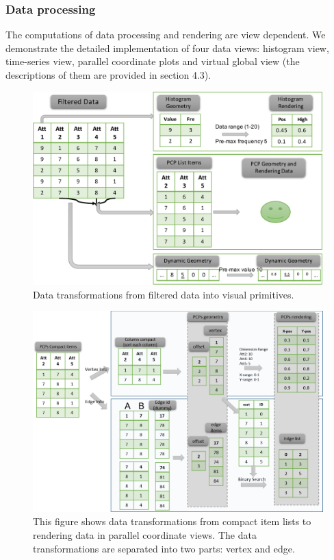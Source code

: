 \subsubsection{Data processing}
The computations of data processing and rendering are view dependent. We demonstrate the detailed implementation of four data views: histogram view, time-series view, parallel coordinate plots and virtual global view (the descriptions of them are provided in section 4.3).

\begin{figure}[htb]
	\centering
	\includegraphics[width=1.0\linewidth]{pic/tran2.pdf}
	\parbox[t]{1.0\columnwidth}{\relax
	}
	\caption{\label{fig:dataTran2} Data transformations from filtered data into visual primitives.}
\end{figure} 


\begin{figure}[htb]
	\centering
	\includegraphics[width=1.0\linewidth]{pic/trans3.pdf}
	\parbox[t]{1.0\columnwidth}{\relax
	}
	\caption{\label{fig:dataTran3} This figure shows data transformations from compact item lists to rendering data in parallel coordinate views. The data transformations are separated into two parts: vertex and edge.}
\end{figure} 

